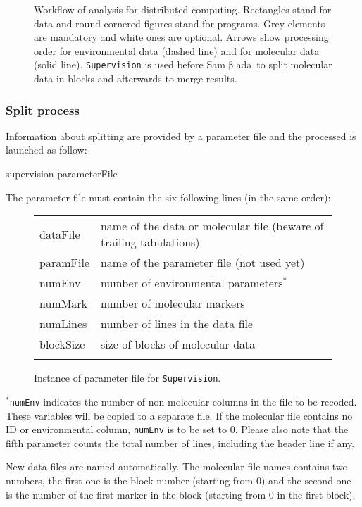 \documentclass[a4paper,11pt]{article}
\newcommand{\smb}{\textsf{Sam$\upbeta$ada}}
\newcommand{\prog}[1]{\texttt{#1}}
\newenvironment{launch}{\begin{mdframed}\ttfamily}{\end{mdframed}}
\begin{document}
\begin{figure}[htbp]
\begin{center}
\caption{Workflow of analysis for distributed computing.
Rectangles stand for data and round-cornered figures stand for programs.
Grey elements are mandatory and white ones are optional.
Arrows show processing order for environmental data (dashed line) and for molecular data (solid line).
\prog{Supervision} is used before \smb\  to split molecular data in blocks and afterwards to merge results.}
\label{fig:workflow-supervision}
\end{center}
\end{figure}

\subsubsection{Split process}
Information about splitting are provided by a parameter file and the processed is launched as follow: 
\begin{launch}
supervision parameterFile
\end{launch}
The parameter file must contain the six following lines (in the same order):
\begin{figure}[H]
\centering
\begin{tabular}{|>{\ttfamily}l|l}
\cline{1-1}
dataFile &		name of the data or molecular file \scriptsize(beware of trailing tabulations)\\	
paramFile & 	name of the parameter file (not used yet)\\	
numEnv	&	number of environmental parameters$^{\ast}$\\	
numMark	&  	number of molecular markers\\
numLines	&	number of lines in the data file\\
blockSize	&	size of blocks of molecular data\\
\cline{1-1}
 \end{tabular}%
 \caption{Instance of parameter file for \prog{Supervision}.}
 \label{fig:paramSupervision}
\end{figure}
\noindent
$^{\ast}$\texttt{numEnv} indicates the number of non-molecular columns in the file to be recoded.
These variables will be copied to a separate file.
If the molecular file contains no ID or environmental column, \texttt{numEnv} is to be set to 0.
Please also note that the fifth parameter counts the total number of lines, including the header line if any.

New data files are named automatically.
The molecular file names contains two numbers, the first one is the block number (starting from 0) and the second one is the number of the first marker in the block (starting from 0 in the first block).
\end{document}
